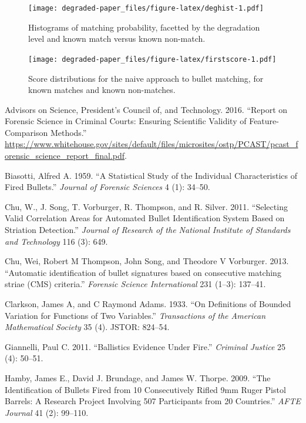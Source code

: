 \documentclass[12pt,]{article}
\theoremstyle{definition}
\theoremstyle{definition}
\theoremstyle{definition}
\theoremstyle{remark}
\begin{document}
\begin{figure}[htbp]
\centering
\texttt{[image: degraded-paper\_files/figure-latex/deghist-1.pdf]}
\caption{\label{fig:deghist}Histograms of matching probability, facetted by
the degradation level and known match versus known non-match.}
\end{figure}

\begin{figure}[htbp]
\centering
\texttt{[image: degraded-paper\_files/figure-latex/firstscore-1.pdf]}
\caption{\label{fig:firstscore}Score distributions for the naive approach to
bullet matching, for known matches and known non-matches.}
\end{figure}

\hypertarget{refs}{}
\hypertarget{ref-pcast2016}{}
Advisors on Science, President's Council of, and Technology. 2016.
``Report on Forensic Science in Criminal Courts: Ensuring Scientific
Validity of Feature-Comparison Methods.''
\url{https://www.whitehouse.gov/sites/default/files/microsites/ostp/PCAST/pcast_forensic_science_report_final.pdf}.

\hypertarget{ref-biasotti:1959}{}
Biasotti, Alfred A. 1959. ``A Statistical Study of the Individual
Characteristics of Fired Bullets.'' \emph{Journal of Forensic Sciences}
4 (1): 34--50.

\hypertarget{ref-chu:2011}{}
Chu, W., J. Song, T. Vorburger, R. Thompson, and R. Silver. 2011.
``Selecting Valid Correlation Areas for Automated Bullet Identification
System Based on Striation Detection.'' \emph{Journal of Research of the
National Institute of Standards and Technology} 116 (3): 649.

\hypertarget{ref-thompson:2013}{}
Chu, Wei, Robert M Thompson, John Song, and Theodore V Vorburger. 2013.
``Automatic identification of bullet signatures based on consecutive
matching striae (CMS) criteria.'' \emph{Forensic Science International}
231 (1--3): 137--41.

\hypertarget{ref-clarkson1933definitions}{}
Clarkson, James A, and C Raymond Adams. 1933. ``On Definitions of
Bounded Variation for Functions of Two Variables.'' \emph{Transactions
of the American Mathematical Society} 35 (4). JSTOR: 824--54.

\hypertarget{ref-giannelli:2011}{}
Giannelli, Paul C. 2011. ``Ballistics Evidence Under Fire.''
\emph{Criminal Justice} 25 (4): 50--51.

\hypertarget{ref-hamby:2009}{}
Hamby, James E., David J. Brundage, and James W. Thorpe. 2009. ``The
Identification of Bullets Fired from 10 Consecutively Rifled 9mm Ruger
Pistol Barrels: A Research Project Involving 507 Participants from 20
Countries.'' \emph{AFTE Journal} 41 (2): 99--110.
\end{document}
